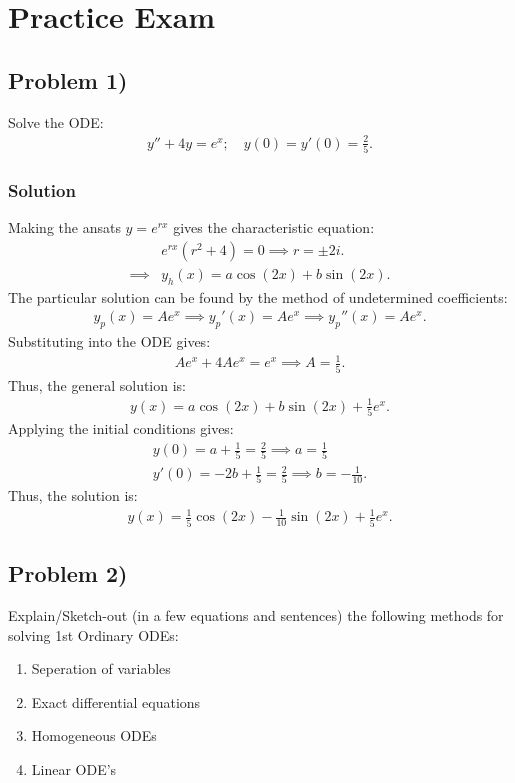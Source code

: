 \section{Practice Exam}

\subsection*{Problem 1)}
Solve the ODE:
\begin{align*}
    y'' + 4y = e^{x}; \quad y(0) = y'(0) = \frac{2}{5}.
\end{align*}

\subsubsection*{Solution}
Making the ansats $y = e^{rx}$ gives the characteristic equation:
\begin{align*}
    &e^{rx}(r^2 + 4) = 0 \implies r = \pm 2i.\\
    \implies& y_h(x) = a\cos(2x) + b\sin(2x).
\end{align*}The particular solution can be found by the method of undetermined coefficients:
\begin{align*}
    y_p(x) = Ae^x \implies y_p'(x) = Ae^x \implies y_p''(x) = Ae^x.
\end{align*}Substituting into the ODE gives:
\begin{align*}
    Ae^x + 4Ae^x = e^x \implies A = \frac{1}{5}.
\end{align*}Thus, the general solution is:
\begin{align*}
    y(x) = a\cos(2x) + b\sin(2x) + \frac{1}{5}e^x.
\end{align*}Applying the initial conditions gives:
\begin{align*}
    y(0) = a + \frac{1}{5} = \frac{2}{5} \implies a = \frac{1}{5}\\
    y'(0) = -2b + \frac{1}{5} = \frac{2}{5} \implies b = -\frac{1}{10}.
\end{align*}Thus, the solution is:
\begin{align*}
    y(x) = \frac{1}{5}\cos(2x) - \frac{1}{10}\sin(2x) + \frac{1}{5}e^x.
\end{align*}

\subsection*{Problem 2)}
Explain/Sketch-out (in a few equations and sentences) the following methods for solving 1st Ordinary ODEs:
\begin{enumerate}
    \item Seperation of variables
    \item Exact differential equations
    \item Homogeneous ODEs
    \item Linear ODE's
\end{enumerate}

